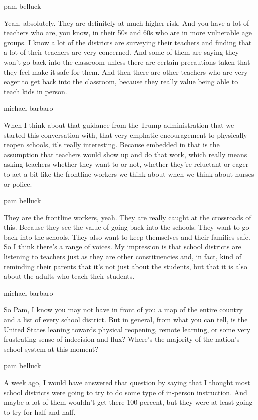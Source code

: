 pam belluck

Yeah, absolutely. They are definitely at much higher risk. And you have
a lot of teachers who are, you know, in their 50s and 60s who are in
more vulnerable age groups. I know a lot of the districts are surveying
their teachers and finding that a lot of their teachers are very
concerned. And some of them are saying they won't go back into the
classroom unless there are certain precautions taken that they feel make
it safe for them. And then there are other teachers who are very eager
to get back into the classroom, because they really value being able to
teach kids in person.

michael barbaro

When I think about that guidance from the Trump administration that we
started this conversation with, that very emphatic encouragement to
physically reopen schools, it's really interesting. Because embedded in
that is the assumption that teachers would show up and do that work,
which really means asking teachers whether they want to or not, whether
they're reluctant or eager to act a bit like the frontline workers we
think about when we think about nurses or police.

pam belluck

They are the frontline workers, yeah. They are really caught at the
crossroads of this. Because they see the value of going back into the
schools. They want to go back into the schools. They also want to keep
themselves and their families safe. So I think there's a range of
voices. My impression is that school districts are listening to teachers
just as they are other constituencies and, in fact, kind of reminding
their parents that it's not just about the students, but that it is also
about the adults who teach their students.

michael barbaro

So Pam, I know you may not have in front of you a map of the entire
country and a list of every school district. But in general, from what
you can tell, is the United States leaning towards physical reopening,
remote learning, or some very frustrating sense of indecision and flux?
Where's the majority of the nation's school system at this moment?

pam belluck

A week ago, I would have answered that question by saying that I thought
most school districts were going to try to do some type of in-person
instruction. And maybe a lot of them wouldn't get there 100 percent, but
they were at least going to try for half and half.

